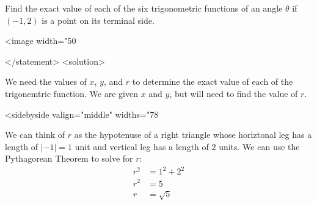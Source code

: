             Find the exact value of each of the six trigonometric functions of an angle $\theta$ if $(-1,2)$ is a point on its terminal side.
          
          \begin{center}
     \label{fig:nonunitcirclenegonetwo}
          \captionsetup{type=figure} 
            <image width="50%
              
                
              
            \end{center}
        </statement>
        <solution>
          
            We need the values of $x$, $y$, and $r$ to determine the exact value of each of the trigonemtric function. We are given $x$ and $y$, but will need to find the value of $r$.
          
          <sidebyside valign="middle" widths="78%
            
              We can think of $r$ as the hypotenuse of a right triangle whose horiztonal leg has a length of $|-1|=1$ unit and vertical leg has a length of $2$ units. We can use the Pythagorean Theorem to solve for $r$:
                \begin{align*}
                   r^2 &= 1^2+2^2 \\
                   r^2 &= 5 \\
                   r &= \sqrt{5} \\
                \end{align*}
            
